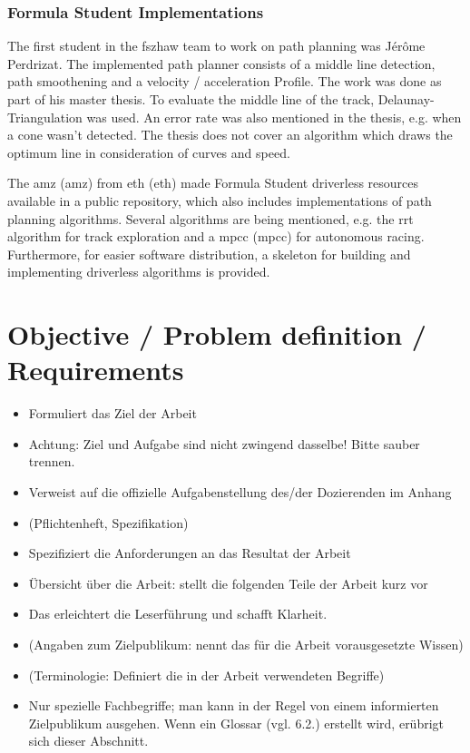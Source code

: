 \subsubsection{Formula Student Implementations}
The first student in the \acrshort{fszhaw} team to work on path planning was Jérôme Perdrizat. The implemented path planner consists of a middle line detection, path smoothening and a velocity / acceleration Profile. The work was done as part of his master thesis. To evaluate the middle line of the track, Delaunay-Triangulation was used. An error rate was also mentioned in the thesis, e.g. when a cone wasn't detected. The thesis does not cover an algorithm which draws the optimum line in consideration of curves and speed.
\cite{autopilot_for_formula_student_jerome}

The \acrshort{amz} (\acrlong{amz}) from \acrshort{eth} (\acrlong{eth}) made Formula Student driverless resources available in a public repository, which also includes implementations of path planning algorithms. Several algorithms are being mentioned, e.g. the \acrshort{rrt} algorithm for track exploration and a \acrlong{mpcc} (\acrshort{mpcc}) for autonomous racing. Furthermore, for easier software distribution, a skeleton for building and implementing driverless algorithms is provided.
\cite{amz_racing_github}

\section{Objective / Problem definition / Requirements}
\begin{itemize}
    \item Formuliert das Ziel der Arbeit
    \item Achtung: Ziel und Aufgabe sind nicht zwingend dasselbe! Bitte sauber trennen.
    \item Verweist auf die offizielle Aufgabenstellung des/der Dozierenden im Anhang
    \item (Pflichtenheft, Spezifikation)
    \item Spezifiziert die Anforderungen an das Resultat der Arbeit
    \item Übersicht über die Arbeit: stellt die folgenden Teile der Arbeit kurz vor
    \item Das erleichtert die Leserführung und schafft Klarheit.
    \item (Angaben zum Zielpublikum: nennt das für die Arbeit vorausgesetzte Wissen)
    \item (Terminologie: Definiert die in der Arbeit verwendeten Begriffe)
    \item Nur spezielle Fachbegriffe; man kann in der Regel von einem informierten Zielpublikum ausgehen.
    Wenn ein Glossar (vgl. 6.2.) erstellt wird, erübrigt sich dieser Abschnitt.
\end{itemize}

